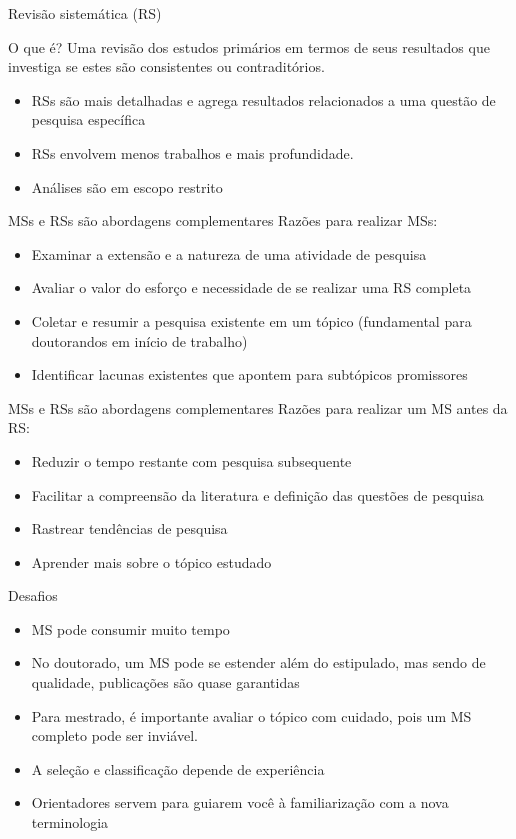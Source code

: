 \begin{frame}{Revisão sistemática (RS)}
\begin{block}{O que é?}
Uma revisão dos estudos primários em termos de seus resultados que investiga se estes são consistentes ou contraditórios.
\end{block}
\begin{itemize}
\item RSs são mais detalhadas e agrega resultados relacionados a uma questão de pesquisa específica
\item RSs envolvem menos trabalhos e mais profundidade.
\item Análises são em escopo restrito
\end{itemize}
\end{frame}

\begin{frame}{MSs e RSs são abordagens complementares}
Razões para realizar MSs:
\begin{itemize}
\item Examinar a extensão e a natureza de uma atividade de pesquisa
\item Avaliar o valor do esforço e necessidade de se realizar uma RS completa
\item Coletar e resumir a pesquisa existente em um tópico (fundamental para doutorandos em início de trabalho)
\item Identificar lacunas existentes que apontem para subtópicos promissores
\end{itemize}
\end{frame}

\begin{frame}{MSs e RSs são abordagens complementares}
Razões para realizar um MS antes da RS:
\begin{itemize}
\item Reduzir o tempo restante com pesquisa subsequente
\item Facilitar a compreensão da literatura e definição das questões de pesquisa
\item Rastrear tendências de pesquisa
\item Aprender mais sobre o tópico estudado
\end{itemize}
\end{frame}

\begin{frame}{Desafios}
\begin{itemize}
\item MS pode consumir muito tempo
\item No doutorado, um MS pode se estender além do estipulado, mas sendo de qualidade, publicações são quase garantidas
\item Para mestrado, é importante avaliar o tópico com cuidado, pois um MS completo pode ser inviável.
\item A seleção e classificação depende de experiência
\item Orientadores servem para guiarem você à familiarização com a nova terminologia
\end{itemize}
\end{frame}

